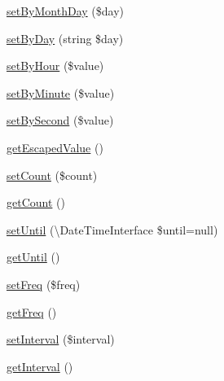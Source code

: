 \begin{DoxyCompactItemize}
\item 
\mbox{\hyperlink{class_eluceo_1_1i_cal_1_1_property_1_1_event_1_1_recurrence_rule_a51cb3376640302adb54a73919d863f70}{set\+By\+Month\+Day}} (\$day)
\item 
\mbox{\hyperlink{class_eluceo_1_1i_cal_1_1_property_1_1_event_1_1_recurrence_rule_abdbd6172cc8c72e3136d183d3009e78d}{set\+By\+Day}} (string \$day)
\item 
\mbox{\hyperlink{class_eluceo_1_1i_cal_1_1_property_1_1_event_1_1_recurrence_rule_ad07d01d74920458bd6fa49c0c256cf98}{set\+By\+Hour}} (\$value)
\item 
\mbox{\hyperlink{class_eluceo_1_1i_cal_1_1_property_1_1_event_1_1_recurrence_rule_a94cd2608d8ecb268f10610e20f4fcd4c}{set\+By\+Minute}} (\$value)
\item 
\mbox{\hyperlink{class_eluceo_1_1i_cal_1_1_property_1_1_event_1_1_recurrence_rule_a747c3236d673a8d18328402576c79fb6}{set\+By\+Second}} (\$value)
\item 
\mbox{\hyperlink{class_eluceo_1_1i_cal_1_1_property_1_1_event_1_1_recurrence_rule_aeefc9e0958f7fbd8fc54d622c6fec793}{get\+Escaped\+Value}} ()
\item 
\mbox{\hyperlink{class_eluceo_1_1i_cal_1_1_property_1_1_event_1_1_recurrence_rule_aac239d51ccec2021d01fc408ea33cbf7}{set\+Count}} (\$count)
\item 
\mbox{\hyperlink{class_eluceo_1_1i_cal_1_1_property_1_1_event_1_1_recurrence_rule_ab8421d5cfd85c4e340cc3964dbb9c1b6}{get\+Count}} ()
\item 
\mbox{\hyperlink{class_eluceo_1_1i_cal_1_1_property_1_1_event_1_1_recurrence_rule_a4734805877b1b97c7fd0be51e76652f5}{set\+Until}} (\textbackslash{}Date\+Time\+Interface \$until=null)
\item 
\mbox{\hyperlink{class_eluceo_1_1i_cal_1_1_property_1_1_event_1_1_recurrence_rule_a0f3229985d8494d4771a3f5576a42c1e}{get\+Until}} ()
\item 
\mbox{\hyperlink{class_eluceo_1_1i_cal_1_1_property_1_1_event_1_1_recurrence_rule_a503cc739b8f888d3d82891981ae10c97}{set\+Freq}} (\$freq)
\item 
\mbox{\hyperlink{class_eluceo_1_1i_cal_1_1_property_1_1_event_1_1_recurrence_rule_ac484c1c9e796e58d8226294d0ece2553}{get\+Freq}} ()
\item 
\mbox{\hyperlink{class_eluceo_1_1i_cal_1_1_property_1_1_event_1_1_recurrence_rule_ac6b278d4cf770de7f9086d4567a5e098}{set\+Interval}} (\$interval)
\item 
\mbox{\hyperlink{class_eluceo_1_1i_cal_1_1_property_1_1_event_1_1_recurrence_rule_ab0c09ee9df8688ca165fcd065cf07687}{get\+Interval}} ()

\end{DoxyCompactItemize}
